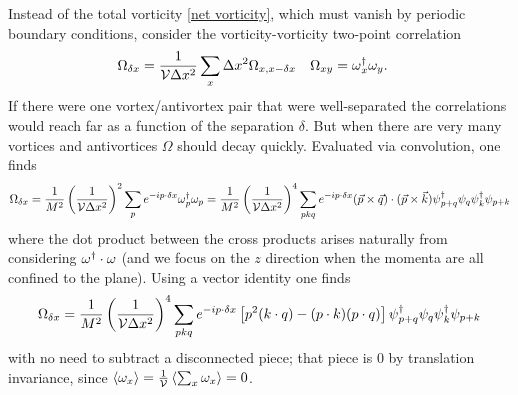 Instead of the total vorticity \eqref{net vorticity}, which must vanish by periodic boundary conditions, consider the vorticity-vorticity two-point correlation
\begin{align}
	\Omega_{\delta x} &= \frac{1}{\mathcal{V} \Delta x^2} \sum_x \Delta x^2 \Omega_{x,x-\delta x}
&	\Omega_{xy} &= \omega{}^{\dagger}_x \omega_y.
\end{align}
If there were one vortex/antivortex pair that were well-separated the correlations would reach far as a function of the separation $\delta$.
But when there are very many vortices and antivortices $\Omega$ should decay quickly.
Evaluated via convolution, one finds
\begin{align}
	\Omega_{\delta x}
	= \frac{1}{M^2}\left(\frac{1}{\mathcal{V} \Delta x^2}\right)^2 \sum_p e^{-ip \cdot \delta x} \omega{}^{\dagger}_p \omega_p
	= \frac{1}{M^2}\left(\frac{1}{\mathcal{V} \Delta x^2}\right)^4 \sum_{pkq} e^{-ip \cdot \delta x} (\vec{p}\times\vec{q})\cdot(\vec{p}\times\vec{k}) \psi{}^{\dagger}_{p+q}\psi_q\psi{}^{\dagger}_k\psi_{p+k}
\end{align}
where the dot product between the cross products arises naturally from considering $\omega{}^{\dagger} \cdot \omega$ (and we focus on the $z$ direction when the momenta are all confined to the plane).
Using a vector identity one finds
\begin{align}
	\Omega_{\delta x}
	= \frac{1}{M^2}\left(\frac{1}{\mathcal{V} \Delta x^2}\right)^4 \sum_{pkq} e^{-ip \cdot \delta x} \left[p^2 (k\cdot q) - (p\cdot k)(p\cdot q)\right] \psi{}^{\dagger}_{p+q}\psi_q\psi{}^{\dagger}_k\psi_{p+k}
\end{align}
with no need to subtract a disconnected piece; that piece is 0 by translation invariance, since $\left\langle \omega_x \right\rangle = \frac{1}{\mathcal{V}} \left\langle \sum_x \omega_x \right\rangle = 0$.
